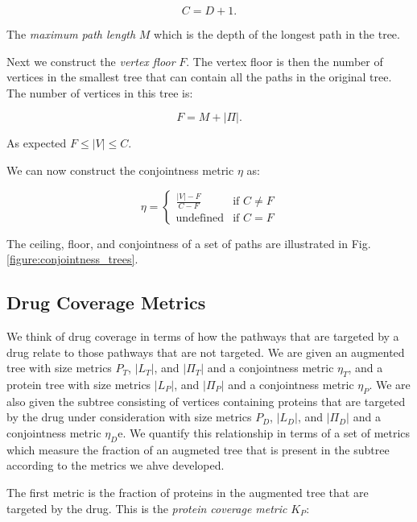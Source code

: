 \documentclass{article}
\begin{document}
\begin{equation}
C = D + 1.
\end{equation}

The \textit{maximum path length} $M$ which is the depth of the longest path in the tree.

Next we construct the \textit{vertex floor} $F$. The vertex floor is then the number of vertices in the smallest tree that can contain all the paths in the original tree. The number of vertices in this tree is:

\begin{equation}
F = M + |\Pi| .
\end{equation}

\noindent As expected $F \leq |V| \leq C$.

We can now construct the conjointness metric $\eta$ as:

\begin{equation}\label{eq:2}
\eta = 
	\begin{cases}
		\frac{|V| - F}{C-F} & \text{if $C \neq F$} \\
		\text{undefined} & \text{if $C = F$}
	\end{cases}
\end{equation}

\noindent The ceiling, floor, and conjointness of a set of paths are illustrated in Fig. \ref{figure:conjointness_trees}.

\subsection{Drug Coverage Metrics}

We think of drug coverage in terms of how the pathways that are targeted by a drug relate to those pathways that are not targeted. We are given an augmented tree with size metrics $P_T$, $|L_T|$, and $|\Pi_T|$ and a conjointness metric $\eta_T$, and a protein tree with size metrics $|L_P|$, and $|\Pi_P|$ and a conjointness metric $\eta_P$. We are also given the subtree consisting of vertices containing proteins that are targeted by the drug under consideration with size metrics $P_D$, $|L_D|$, and $|\Pi_D|$ and a conjointness metric $\eta_D$e. We quantify this relationship in terms of a set of metrics which measure the fraction of an augmeted tree that is present in the subtree according to the metrics we ahve developed.

The first metric is the fraction of proteins in the augmented tree that are targeted by the drug. This is the \textit{protein coverage metric} $K_P$:
\end{document}
